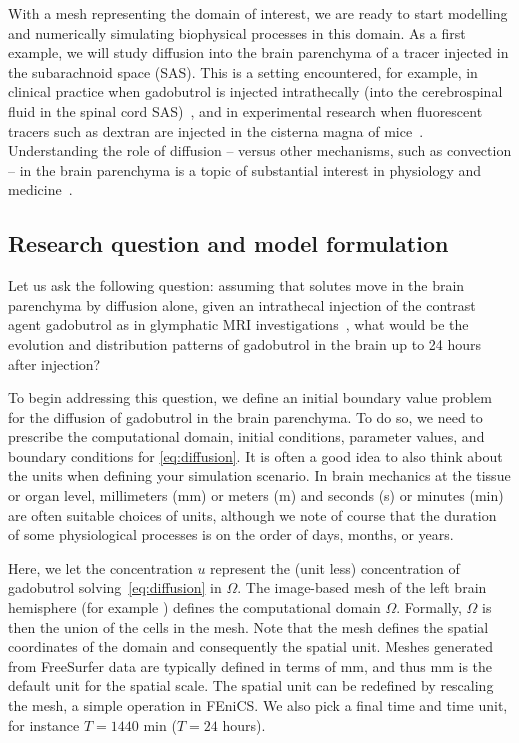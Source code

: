 With a mesh representing the domain of interest, we are ready to start
modelling and numerically simulating biophysical processes in this
domain. As a first example, we will study diffusion into the brain
parenchyma of a tracer injected in the subarachnoid space (SAS). This is a
setting encountered, for example, in clinical practice when gadobutrol is 
injected intrathecally (into the cerebrospinal fluid in the spinal
cord SAS)~\cite{ringstad2018brain}, and in experimental
research when fluorescent tracers such as dextran are injected in the
cisterna magna of mice~\cite{iliff2012paravascular,
  xie2013sleep}. Understanding the role of diffusion -- versus other
mechanisms, such as convection -- in the brain parenchyma is a topic of
substantial interest in physiology and medicine~\cite{abbott2018role}.

\subsection{Research question and model formulation}
\label{chp3:model}

Let us ask the following question: assuming that solutes move in the
brain parenchyma by diffusion alone, given an intrathecal injection of
the contrast agent gadobutrol as in glymphatic MRI
investigations~\cite{ringstad2018brain}, what would be the evolution
and distribution patterns of gadobutrol in the brain up to 24 hours
after injection?

To begin addressing this question, we define an initial boundary value
problem for the diffusion of gadobutrol in the brain parenchyma. To do
so, we need to prescribe the computational domain, initial conditions,
parameter values, and boundary conditions for \eqref{eq:diffusion}. It
is often a good idea to also think about the units when defining your
simulation scenario. In brain mechanics at the tissue or organ level,
millimeters (mm) or meters (m) and seconds (s) or minutes (min) are
often suitable choices of units, although we note of course that the
duration of some physiological processes is on the order of days,
months, or years.

Here, we let the concentration $u$ represent the (unit less)
concentration of gadobutrol solving~\eqref{eq:diffusion} in
$\Omega$. The image-based mesh of the left brain hemisphere (for
example ) defines the computational domain
$\Omega$. Formally, $\Omega$ is then the union of the cells in the
mesh. Note that the mesh defines the spatial coordinates of the domain
and consequently the spatial unit. Meshes generated from FreeSurfer
data are typically defined in terms of mm, and thus mm is the default
unit for the spatial scale. The spatial unit can be redefined by
rescaling the mesh, a simple operation in FEniCS. We also
pick a final time and time unit, for instance $T = 1440$ min ($T = 24$
hours).

